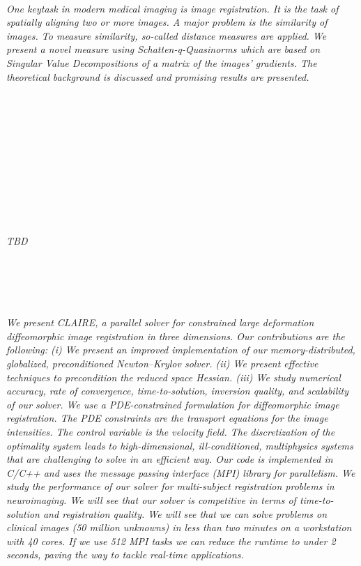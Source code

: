 \begin{multicols}{2}
\\
      \textit{One keytask in modern medical imaging is image registration. It is the task of spatially aligning two or more images. A major problem is the similarity of images. To measure similarity, so-called distance measures are applied. We present a novel
measure using Schatten-q-Quasinorms which are based on Singular Value Decompositions of a matrix of the images' gradients.
The theoretical background is discussed and promising results are presented.}\\
\\ 
        \\
        \\\\
        \\
        \\\\
        \\
        \\\\
\\
      \textit{TBD}\\
\\ 
        \\
        \\\\
\\
      \textit{We present CLAIRE, a parallel solver for constrained large deformation diffeomorphic image registration in three dimensions. Our contributions are the following: (i) We present an improved implementation of our memory-distributed, globalized, preconditioned Newton--Krylov solver. (ii) We present effective techniques to precondition the reduced space Hessian. (iii) We study numerical accuracy, rate of convergence, time-to-solution, inversion quality, and scalability of our solver.
We use a PDE-constrained formulation for diffeomorphic image registration. The PDE constraints are the transport equations for the image intensities. The control variable is the velocity field. The discretization of the optimality system leads to high-dimensional, ill-conditioned, multiphysics systems that are challenging to solve in an efficient way. Our code is implemented in C/C++ and uses the message passing interface (MPI) library for parallelism. We study the performance of our solver for multi-subject registration problems in neuroimaging. We will see that our solver is competitive in terms of time-to-solution and registration quality. We will see that we can solve problems on clinical images (50 million unknowns) in less than two minutes on a workstation with 40 cores. If we use 512 MPI tasks we can reduce the runtime to under 2 seconds, paving the way to tackle real-time applications.}\\

\end{multicols}
